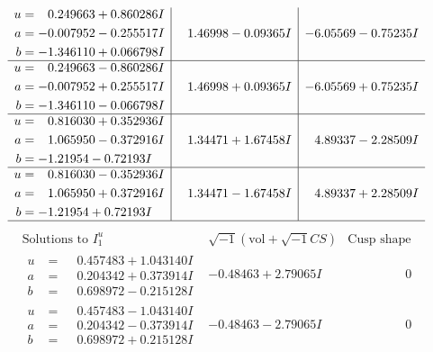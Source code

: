 \documentclass[1p]{elsarticle_modified}
\theoremstyle{definition}
\newcommand{\I}{\sqrt{-1}}
\begin{document}
$$\begin{array}{c|c|c}
\begin{aligned}
u &= \phantom{-}0.249663 + 0.860286 I \\
a &= -0.007952 - 0.255517 I \\
b &= -1.346110 + 0.066798 I\end{aligned}
 & \phantom{-}1.46998 - 0.09365 I & -6.05569 - 0.75235 I \\ \hline\begin{aligned}
u &= \phantom{-}0.249663 - 0.860286 I \\
a &= -0.007952 + 0.255517 I \\
b &= -1.346110 - 0.066798 I\end{aligned}
 & \phantom{-}1.46998 + 0.09365 I & -6.05569 + 0.75235 I \\ \hline\begin{aligned}
u &= \phantom{-}0.816030 + 0.352936 I \\
a &= \phantom{-}1.065950 - 0.372916 I \\
b &= -1.21954 - 0.72193 I\end{aligned}
 & \phantom{-}1.34471 + 1.67458 I & \phantom{-}4.89337 - 2.28509 I \\ \hline\begin{aligned}
u &= \phantom{-}0.816030 - 0.352936 I \\
a &= \phantom{-}1.065950 + 0.372916 I \\
b &= -1.21954 + 0.72193 I\end{aligned}
 & \phantom{-}1.34471 - 1.67458 I & \phantom{-}4.89337 + 2.28509 I\\
 \hline 
 \end{array}$$\newpage$$\begin{array}{c|c|c}  
\text{Solutions to }I^u_{1}& \I (\text{vol} + \sqrt{-1}CS) & \text{Cusp shape}\\
 \hline 
\begin{aligned}
u &= \phantom{-}0.457483 + 1.043140 I \\
a &= \phantom{-}0.204342 + 0.373914 I \\
b &= \phantom{-}0.698972 - 0.215128 I\end{aligned}
 & -0.48463 + 2.79065 I & \phantom{-0.000000 } 0 \\ \hline\begin{aligned}
u &= \phantom{-}0.457483 - 1.043140 I \\
a &= \phantom{-}0.204342 - 0.373914 I \\
b &= \phantom{-}0.698972 + 0.215128 I\end{aligned}
 & -0.48463 - 2.79065 I & \phantom{-0.000000 } 0 \\ \hline\begin{aligned}

\end{aligned}
\end{array}$$
\end{document}
